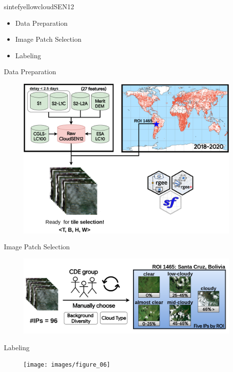 \documentclass{beamer}
\begin{document}
\begin{chapter}{sintefyellow}{cloudSEN12}
	\begin{itemize}
		\item Data Preparation
		\item Image Patch Selection
		\item Labeling
	\end{itemize}
\end{chapter}

\begin{frame}{Data Preparation}
\begin{figure}
	\centering
	\includegraphics[width=0.7\linewidth]{images/figure_04}
	\label{fig:figure04}
\end{figure}
\end{frame}


\begin{frame}{Image Patch Selection}
	\begin{figure}
		\centering
		\includegraphics[width=0.9\linewidth]{images/figure_05.png}
	\end{figure}
\end{frame}


\begin{frame}{Labeling}
	\begin{figure}
		\centering
		\texttt{[image: images/figure\_06]}
		\label{fig:figure04}
	\end{figure}
\end{frame}
\end{document}
